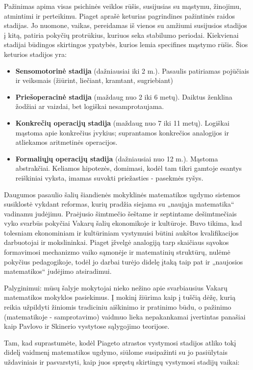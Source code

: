 \documentclass{article}
\begin{document}
Pažinimas apima visas psichinės veiklos rūšis, susijusias su mąstymu, žinojimu,
atmintimi ir perteikimu. Piaget aprašė keturias pagrindines pažintinės raidos
stadijas. Jo nuomone, vaikas, pereidamas iš vienos su amžiumi
susijusios stadijos į kitą, patiria pokyčių protrūkius, kuriuos seka stabilumo
periodai. Kiekvienai stadijai būdingos skirtingos ypatybės, kurios lemia specifines
mąstymo rūšis. Šios keturios stadijos yra:
\begin{itemize}
\item \textbf{Sensomotorinė stadija} (dažniausiai iki 2 m.). Pasaulis patiriamas pojūčiais ir veiksmais (žiūrint, liečiant, kramtant, sugriebiant)
\item \textbf{Priešoperacinė stadija} (maždaug nuo 2 iki 6 metų). Daiktus ženklina žodžiai ar vaizdai, bet logiškai nesamprotaujama.
\item \textbf{Konkrečių operacijų stadija} (maždaug nuo 7 iki 11 metų). Logiškai mąstoma apie konkrečius įvykius; suprantamos
konkrečios analogijos ir atliekamos aritmetinės operacijos.
\item \textbf{Formaliųjų operacijų stadija} (dažniausiai nuo 12 m.). Mąstoma abstrakčiai. Keliamos hipotezės, domimasi, kodėl tam tikri gamtoje esantys reiškiniai vyksta, imamas suvokti priežasties - pasekmės ryšys.
\end{itemize}

Daugumos pasaulio šalių šiandienės mokyklinės matematikos ugdymo sistemos susiklostė vykdant reformas, kurių pradžia siejama su „naująja matematika“ vadinamu judėjimu. Praėjusio šimtmečio šeštame ir septintame dešimtmečiais vyko svarbūs pokyčiai Vakarų šalių ekonomikoje ir kultūroje. Buvo tikima, kad tolesniam ekonominiam ir kultūriniam vystymuisi būtini aukštos kvalifikacijos darbuotojai ir mokslininkai. Piaget įžvelgė analogiją tarp skaičiaus sąvokos formavimosi mechanizmo vaiko sąmonėje ir matematinių struktūrų, nulėmė pokyčius pedagogikoje, todėl jo darbai turėjo didelę įtaką taip pat ir „naujosios matematikos“ judėjimo atsiradimui.

Palyginimui: mūsų šalyje mokytojai nieko nežino apie svarbiausius Vakarų matematikos mokyklos pasiekimus. Į mokinį žiūrima kaip į tuščią dėžę, kurią reikia užpildyti žiniomis tradiciniu aiškinimo ir pratinimo būdu, o pažinimo (matematikoje - samprotavimo) vaidmuo lieka nepakankamai įvertintas panašiai kaip Pavlovo ir Skinerio vystytose sąlygojimo teorijose.

Tam, kad suprastumėte, kodėl Piageto atrastos vystymosi stadijos atliko tokį didelį vaidmenį matematikos ugdymo, siūlome susipažinti su jo pasiūlytais uždaviniais ir pasvarstyti, kaip juos spręstų skirtingų vystymosi stadijų vaikai:
\end{document}
